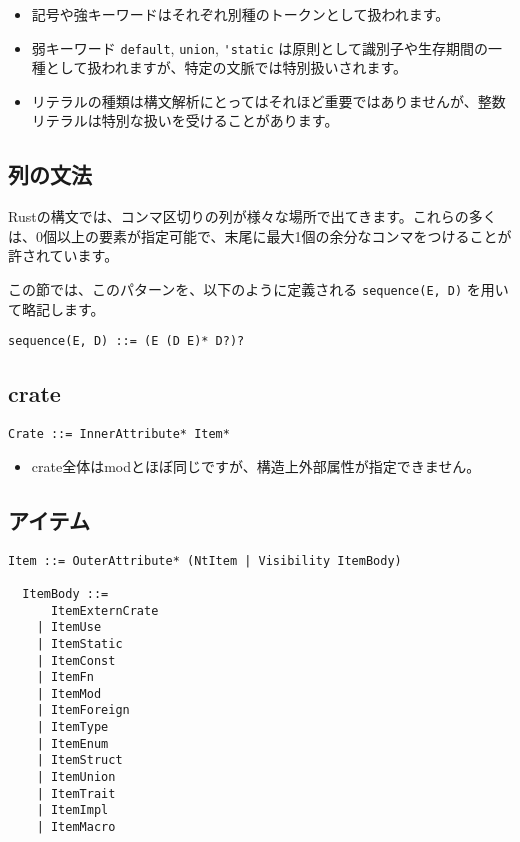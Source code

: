 \documentclass[dvipdfmx,uplatex,papersize,a4paper,10pt]{jsbook}
\theoremstyle{definition}
\begin{document}
\begin{itemize}
  \item 記号や強キーワードはそれぞれ別種のトークンとして扱われます。
  \item 弱キーワード \verb|default|, \verb|union|, \verb|'static| は原則として識別子や生存期間の一種として扱われますが、特定の文脈では特別扱いされます。
  \item リテラルの種類は構文解析にとってはそれほど重要ではありませんが、整数リテラルは特別な扱いを受けることがあります。
\end{itemize}

\subsection{列の文法}

Rustの構文では、コンマ区切りの列が様々な場所で出てきます。これらの多くは、0個以上の要素が指定可能で、末尾に最大1個の余分なコンマをつけることが許されています。

この節では、このパターンを、以下のように定義される \verb|sequence(E, D)| を用いて略記します。

\begin{lstlisting}[language=BNFLike, gobble=2]
  sequence(E, D) ::= (E (D E)* D?)?
\end{lstlisting}

\subsection{crate}

\begin{lstlisting}[language=BNFLike, gobble=2]
  Crate ::= InnerAttribute* Item*
\end{lstlisting}

\begin{itemize}
  \item crate全体はmodとほぼ同じですが、構造上外部属性が指定できません。
\end{itemize}

\subsection{アイテム}

\begin{lstlisting}[language=BNFLike, gobble=2]
  Item ::= OuterAttribute* (NtItem | Visibility ItemBody)

  ItemBody ::=
      ItemExternCrate
    | ItemUse
    | ItemStatic
    | ItemConst
    | ItemFn
    | ItemMod
    | ItemForeign
    | ItemType
    | ItemEnum
    | ItemStruct
    | ItemUnion
    | ItemTrait
    | ItemImpl
    | ItemMacro
\end{lstlisting}
\end{document}
